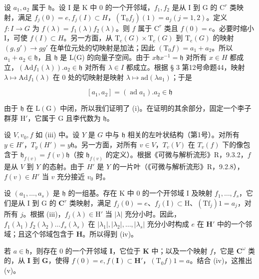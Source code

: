设 \(a_1, a_2\) 属于 \(\mathfrak{h}\)。设 I 是 K 中 0 的一个开邻域，\(f_1, f_2\) 是从 I 到 G 的 \(\mathrm{C}^r\) 类映射，满足 \(f_j(0) = e, f_j(I) \subset H\)，\((\mathrm{T}_0 f_j)(1) = a_j (j = 1, 2)\)。定义 \(f: I \to G\) 为 \(f(\lambda) = f_1(\lambda)f_2(\lambda)\)。则 \(f\) 属于 \(\mathrm{C}^r\) 类且 \(f(0) = e\)。必要时缩小 I，可使 \(f(I) \subset H\)。另一方面，从 \(\mathrm{T}_e(G) \times \mathrm{T}_e(G)\) 到 \(\mathrm{T}_e(G)\) 的映射 \((g, g') \to gg'\) 在单位元处的切映射是加法；因此 \((\mathrm{T}_0 f) = a_1 + a_2\)。所以 \(a_1 + a_2 \in \mathfrak{h}\)，且 \(\mathfrak{h}\) 是 L(G) 的向量子空间。由于 \(x\mathfrak{h}x^{-1} = \mathfrak{h}\) 对所有 \(x \in H\) 都成立，\((\mathrm{Ad}f_1(\lambda)).a_2 \in \mathfrak{h}\) 对所有 \(\lambda \in I\) 都成立。根据 § 3 第12号命题44，映射 \(\lambda \mapsto \mathrm{Ad}f_1(\lambda)\) 在 0 处的切映射是映射 \(\lambda \mapsto \mathrm{ad}(\lambda a_1)\)；于是

\[
\left[ a _ {1}, a _ {2} \right] = (\operatorname{ad} a _ {1}). a _ {2} \in \mathfrak {h}
\]

由于 \(\mathfrak{h}\) 在 \(\mathrm{L}(\mathrm{G})\) 中闭，所以我们证明了 (i)。在证明的其余部分，固定一个李子群芽 \(\mathrm{H}'\)，它属于 \(\mathrm{G}\) 且李代数为 \(\mathfrak{h}\)。

设 \(V, v_0, f\) 如 (iii) 中。设 \(Y\) 是 \(G\) 中与 \(\mathfrak{h}\) 相关的左叶状结构（第1号）。对所有 \(y \in H'\)，\(T_y(H') = y\mathfrak{h}\)。另一方面，对所有 \(v \in V\)，\(T_v(V)\) 在 \(T_v(f)\) 下的像包含于 \(\mathfrak{h}_{f(v)} = f(v)\mathfrak{h}\)（按 \(\mathfrak{h}_{f(v)}\) 的定义）。根据《可微与解析流形》R，9.3.2，\(f\) 是从 \(V\) 到 \(Y\) 的态射。由于 \(H'\) 是 \(Y\) 的一片叶（《可微与解析流形》R，9.2.8），\(f(v) \in H'\) 当 \(v\) 充分接近 \(v_0\) 时。

设 \((a_{1},\ldots ,a_{s})\) 是 \(\mathfrak{h}\) 的一组基。存在 K 中 0 的一个开邻域 I 及映射 \(f_{1},\ldots ,f_{s}\)，它们是从 I 到 G 的 \(\mathbf{C}^r\) 类映射，满足 \(f_{j}(0) = e\)、\(f_{j}(\mathrm{I})\subset \mathrm{H}\)、\((\mathrm{Tf}_j)1 = a_j\)，对所有 \(j\)。根据 (iii)，\(f_{j}(\lambda)\in \mathrm{H}'\) 当 \(|\lambda |\) 充分小时。因此，\(f_{1}(\lambda_{1})f_{2}(\lambda_{2})\ldots f_{s}(\lambda_{s})\) 在 \(|\lambda_1|,\left|\lambda_2\right|,\ldots ,|\lambda_s|\) 充分小时构成 \(e\) 在 \(\mathbf{H}'\) 中的一个邻域；且这个邻域包含于 \(\mathbf{H}\)。所以得到 (iv)。

若 \(a \in \mathfrak{h}\)，则存在 0 的一个开邻域 \(\mathbf{I}\)，它位于 \(\mathbf{K}\) 中；以及一个映射 \(f\)，它是 \(\mathbf{C}^{\omega}\) 类的，从 \(\mathbf{I}\) 到 \(\mathbf{G}\)，使得 \(f(0) = e, f(\mathbf{I}) \subset \mathbf{H}'\)，\((\mathrm{T}_0f)1 = a\)。结合 (iv)，这推出 (v)。

